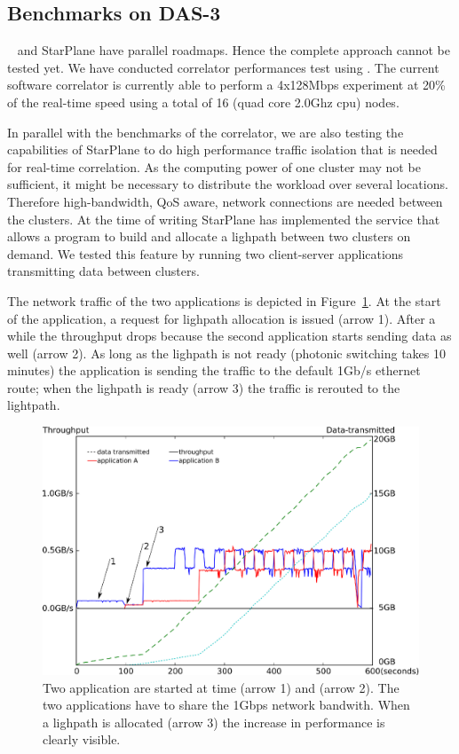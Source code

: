 \subsection{Benchmarks on DAS-3}
\scarie~ and StarPlane have parallel roadmaps. Hence the complete
approach cannot be tested yet. We have conducted correlator
performances test using . The current software correlator is
currently able to perform a 4x128Mbps experiment at 20\% of the
real-time speed using a total of 16 (quad core 2.0Ghz cpu) nodes.

In parallel with the benchmarks of the correlator, we are also testing
the capabilities of StarPlane to do high performance traffic isolation
that is needed for real-time correlation. As the computing power of
one cluster may not be sufficient, it might be necessary to distribute
the workload over several locations. Therefore high-bandwidth, QoS
aware, network connections are needed between the clusters. At the
time of writing StarPlane has implemented the service that allows a
program to build and allocate a lighpath between two clusters on
demand. We tested this feature by running two client-server
applications transmitting data between clusters.

The network traffic of the two applications is depicted in
Figure~\ref{fig:timing}.  At the start of the application, a request
for lighpath allocation is issued (arrow 1). After a while the
throughput drops because the second application starts sending data as
well (arrow 2).  As long as the lighpath is not ready (photonic
switching takes 10 minutes) the application is sending the traffic to
the default 1Gb/s ethernet route; when the lighpath is ready (arrow 3)
the traffic is rerouted to the lightpath.

\begin{figure}[ht]
  \centering
  \includegraphics[width=\textwidth] {img/timing.eps}
  \caption{\label{fig:timing} Two application are started at time
    (arrow 1) and (arrow 2). The two applications have to share the
    1Gbps network bandwith. When a lighpath is allocated (arrow 3) the
    increase in performance is clearly visible.}
\end{figure} 

